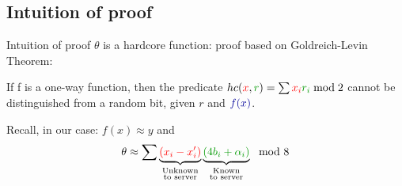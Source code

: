 \documentclass[]{beamer}
\begin{document}
\subsection{Intuition of proof}
\begin{frame}{Intuition of proof}
$\theta$ is a hardcore function: proof based on Goldreich-Levin Theorem:
\begin{theorem}
If f is a one-way function, then the predicate $hc(\textcolor{red}{x}, \textcolor{green!60!black}{r}) = \sum \textcolor{red}{x_i} \textcolor{green!60!black}{r_i} \bmod 2$ cannot be distinguished from a random bit, given \textcolor{green!60!black}{$r$} and $\textcolor{blue!60!black}{f(x)}$. 
\end{theorem}
Recall, in our case: \textcolor{blue!60!black}{$f(x) \approx y$} and\\
$$ \theta \approx \sum \underbrace{\textcolor{red}{(x_i - x_i')}}_{\substack{\text{Unknown} \\ \text{to server}}} \underbrace{\textcolor{green!60!black}{(4b_i + \alpha_i)}}_{\substack{\text{Known} \\ \text{to server}}}\mod 8$$
\end{frame}



\end{document}
